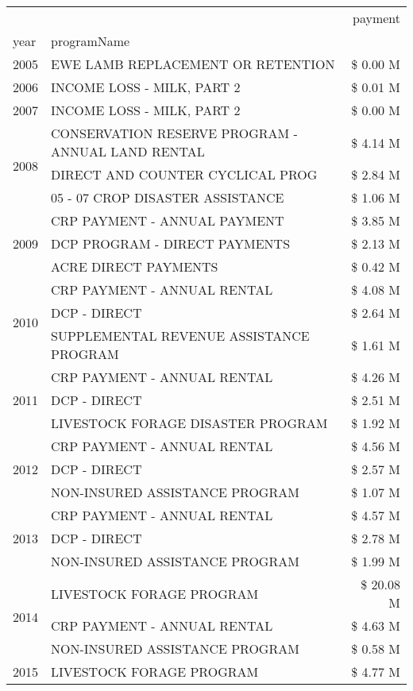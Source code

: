 \begin{tabular}{llr}
\toprule
 &  & payment \\
year & programName &  \\
\midrule
2005 & EWE LAMB REPLACEMENT OR RETENTION & \$ 0.00 M \\
\cline{1-3}
2006 & INCOME LOSS - MILK, PART 2 & \$ 0.01 M \\
\cline{1-3}
2007 & INCOME LOSS - MILK, PART 2 & \$ 0.00 M \\
\cline{1-3}
\multirow[t]{3}{*}{2008} & CONSERVATION RESERVE PROGRAM - ANNUAL LAND RENTAL & \$ 4.14 M \\
 & DIRECT AND COUNTER CYCLICAL PROG & \$ 2.84 M \\
 & 05 - 07 CROP DISASTER ASSISTANCE & \$ 1.06 M \\
\cline{1-3}
\multirow[t]{3}{*}{2009} & CRP PAYMENT - ANNUAL PAYMENT & \$ 3.85 M \\
 & DCP PROGRAM - DIRECT PAYMENTS & \$ 2.13 M \\
 & ACRE DIRECT PAYMENTS & \$ 0.42 M \\
\cline{1-3}
\multirow[t]{3}{*}{2010} & CRP PAYMENT - ANNUAL RENTAL & \$ 4.08 M \\
 & DCP - DIRECT & \$ 2.64 M \\
 & SUPPLEMENTAL REVENUE ASSISTANCE PROGRAM & \$ 1.61 M \\
\cline{1-3}
\multirow[t]{3}{*}{2011} & CRP PAYMENT - ANNUAL RENTAL & \$ 4.26 M \\
 & DCP - DIRECT & \$ 2.51 M \\
 & LIVESTOCK FORAGE DISASTER PROGRAM & \$ 1.92 M \\
\cline{1-3}
\multirow[t]{3}{*}{2012} & CRP PAYMENT - ANNUAL RENTAL & \$ 4.56 M \\
 & DCP - DIRECT & \$ 2.57 M \\
 & NON-INSURED ASSISTANCE PROGRAM & \$ 1.07 M \\
\cline{1-3}
\multirow[t]{3}{*}{2013} & CRP PAYMENT - ANNUAL RENTAL & \$ 4.57 M \\
 & DCP - DIRECT & \$ 2.78 M \\
 & NON-INSURED ASSISTANCE PROGRAM & \$ 1.99 M \\
\cline{1-3}
\multirow[t]{3}{*}{2014} & LIVESTOCK FORAGE PROGRAM & \$ 20.08 M \\
 & CRP PAYMENT - ANNUAL RENTAL & \$ 4.63 M \\
 & NON-INSURED ASSISTANCE PROGRAM & \$ 0.58 M \\
\cline{1-3}
\multirow[t]{3}{*}{2015} & LIVESTOCK FORAGE PROGRAM & \$ 4.77 M \\

\end{tabular}
